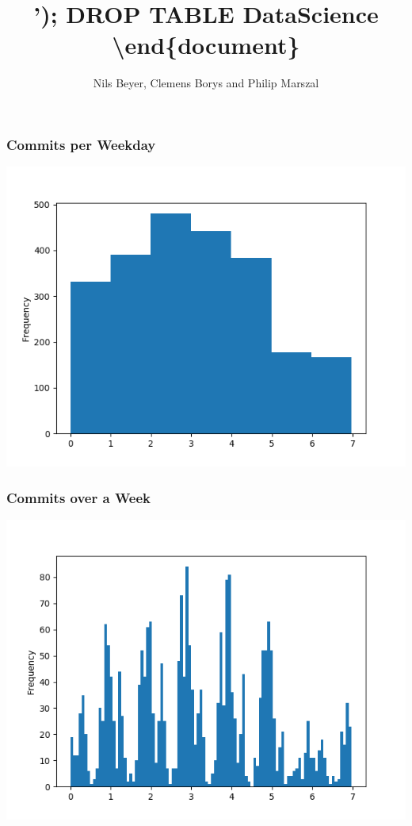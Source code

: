 \documentclass{beamer}
\begin{document}
\title{'); DROP TABLE DataScience \textbackslash end\{document\}}
\author{Nils Beyer, Clemens Borys and Philip Marszal}
\begin{frame}
\titlepage
\end{frame}

\begin{frame}\frametitle{Commits per Weekday}
\centering
\includegraphics[width=\textwidth]{weekperiod_rough.png}
\end{frame}

\begin{frame}\frametitle{Commits over a Week}
\centering
\includegraphics[width=\textwidth]{weekperiod.png}
\end{frame}
\end{document}
